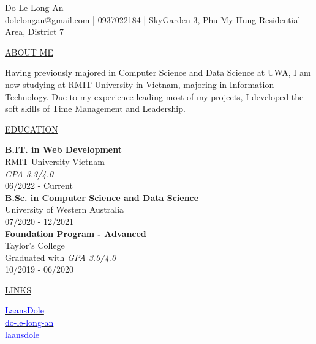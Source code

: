 \documentclass[11pt]{article}
\newcommand{\resumetitle}[3]{
    \AddToShipoutPictureBG{
        \AtPageUpperLeft {
        \raisebox{-0.09\paperheight}{
            \color{black!85}\rule{2\paperwidth}{\paperheight}}
        }}
    \begin{Center}
        \begingroup
        \titlethin
        \color{black!10}\Huge{#1}
        \titlethick
        \color{black!5}\Huge{#2} \\
        \vspace{2mm}
        \textrm{\color{black!15}\Large{#3}}
        \endgroup
    \end{Center}
    \vspace{7mm}
}
\newcommand{\betteruline}[1]{
    \uline{#1}
}
\newcommand{\sectiontitle}[1]{
    \begingroup
        \titlebold
        \betteruline{\Large\uppercase{#1}  }
        \vspace{1.7mm}
    \endgroup
}
\newcommand{\sectioncontent}[1]{
    \begingroup
        \begin{FlushLeft}
        \vspace{-3mm}
        \sffamily\small#1
        \end{FlushLeft}
    \endgroup
    \vspace{2mm}
}
\begin{document}
    \resumetitle{Do}{Le Long An} {
        dolelongan@gmail.com |
        0937022184 |
        SkyGarden 3, Phu My Hung Residential Area, District 7
    }

    \setlength{\columnsep}{7mm}
    \begin{paracol}{2}

    \sectiontitle{about me}
    \sectioncontent{
        Having previously majored in Computer Science and Data Science at UWA, I am now studying at RMIT University in Vietnam, majoring in Information Technology. Due to my experience leading most of my projects, I developed the soft skills of Time Management and Leadership.
    }

    \sectiontitle{education}
    \sectioncontent{
        \textbf{B.IT. in Web Development} \\
        RMIT University Vietnam \\
        \textit{GPA 3.3/4.0} \\
        \vspace{1mm}
        \textcolor{black!70}{06/2022 - Current} \\
        \vspace{2mm}
        \textbf{B.Sc. in Computer Science and Data Science} \\
        University of Western Australia \\
        \vspace{1mm}
        \textcolor{black!70}{07/2020 - 12/2021} \\
         \vspace{2mm}
         \textbf{Foundation Program - Advanced} \\
        Taylor's College \\
        Graduated with \textit{GPA 3.0/4.0} \\
        \vspace{1mm}
        \textcolor{black!70}{10/2019 - 06/2020} \\
    }

    \sectiontitle{links}
    \sectioncontent{
        \hspace{3mm}
        \href{https://github.com/LaansDole}{\textcolor{blue}{LaansDole}} \\
        \vspace{2mm}
        \faIcon{linkedin-in}\hspace{3mm}
        \href{https://www.linkedin.com/in/do-le-long-an/}{\textcolor{blue}{do-le-long-an}} \\
        \vspace{2mm}
        \faIcon{facebook}\hspace{3mm}
        \href{https://www.facebook.com/laansdole/}{\textcolor{blue}{laansdole}}
    }


\end{paracol}
\end{document}

